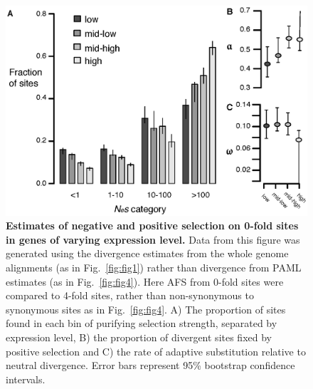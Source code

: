 \begin{figure}[ht!]
      \centering
       \includegraphics[width=\linewidth]{Ch2FigS11}
    \caption{\textbf{Estimates of negative and positive selection on 0-fold sites in genes of varying expression level.} Data from this figure was generated using the divergence estimates from the whole genome alignments (as in Fig.~\ref{fig:fig1}) rather than divergence from PAML estimates (as in Fig.~\ref{fig:fig4}). Here AFS from 0-fold sites were compared to 4-fold sites, rather than non-synonymous to synonymous sites as in Fig.~\ref{fig:fig4}. A) The proportion of sites found in each bin of purifying selection strength, separated by expression level, B) the proportion of divergent sites fixed by positive selection and C) the rate of adaptive substitution relative to neutral divergence. Error bars represent 95\% bootstrap confidence intervals.}
    \label{fig:figS11}
\end{figure}



